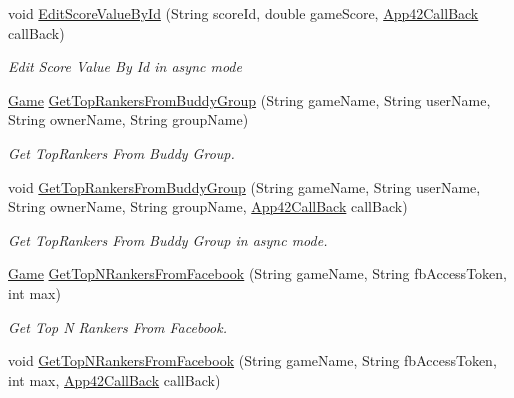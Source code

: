 \begin{DoxyCompactItemize}
void \hyperlink{classcom_1_1shephertz_1_1app42_1_1paas_1_1sdk_1_1csharp_1_1game_1_1_score_board_service_af598d5892afefa1c9a77d72020ccd635}{Edit\+Score\+Value\+By\+Id} (String score\+Id, double game\+Score, \hyperlink{interfacecom_1_1shephertz_1_1app42_1_1paas_1_1sdk_1_1csharp_1_1_app42_call_back}{App42\+Call\+Back} call\+Back)
\begin{DoxyCompactList}\small\item\em Edit Score Value By Id in async mode \end{DoxyCompactList}\item 
\hyperlink{classcom_1_1shephertz_1_1app42_1_1paas_1_1sdk_1_1csharp_1_1game_1_1_game}{Game} \hyperlink{classcom_1_1shephertz_1_1app42_1_1paas_1_1sdk_1_1csharp_1_1game_1_1_score_board_service_a1d2db024944281f8d20b51d2cec665e6}{Get\+Top\+Rankers\+From\+Buddy\+Group} (String game\+Name, String user\+Name, String owner\+Name, String group\+Name)
\begin{DoxyCompactList}\small\item\em Get Top\+Rankers From Buddy Group. \end{DoxyCompactList}\item 
void \hyperlink{classcom_1_1shephertz_1_1app42_1_1paas_1_1sdk_1_1csharp_1_1game_1_1_score_board_service_a6509a9ad8309b5bf2dda9cb7e4d017aa}{Get\+Top\+Rankers\+From\+Buddy\+Group} (String game\+Name, String user\+Name, String owner\+Name, String group\+Name, \hyperlink{interfacecom_1_1shephertz_1_1app42_1_1paas_1_1sdk_1_1csharp_1_1_app42_call_back}{App42\+Call\+Back} call\+Back)
\begin{DoxyCompactList}\small\item\em Get Top\+Rankers From Buddy Group in async mode. \end{DoxyCompactList}\item 
\hyperlink{classcom_1_1shephertz_1_1app42_1_1paas_1_1sdk_1_1csharp_1_1game_1_1_game}{Game} \hyperlink{classcom_1_1shephertz_1_1app42_1_1paas_1_1sdk_1_1csharp_1_1game_1_1_score_board_service_ae2aebf892bd61bc2189074a009d4e443}{Get\+Top\+N\+Rankers\+From\+Facebook} (String game\+Name, String fb\+Access\+Token, int max)
\begin{DoxyCompactList}\small\item\em Get Top N Rankers From Facebook. \end{DoxyCompactList}\item 
void \hyperlink{classcom_1_1shephertz_1_1app42_1_1paas_1_1sdk_1_1csharp_1_1game_1_1_score_board_service_af311ad8cd32dfa81d93d236955fe2f4d}{Get\+Top\+N\+Rankers\+From\+Facebook} (String game\+Name, String fb\+Access\+Token, int max, \hyperlink{interfacecom_1_1shephertz_1_1app42_1_1paas_1_1sdk_1_1csharp_1_1_app42_call_back}{App42\+Call\+Back} call\+Back)

\end{DoxyCompactItemize}
